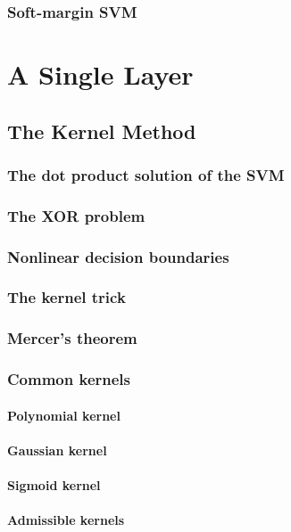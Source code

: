 \documentclass[11pt]{book} %
\begin{document}
%
%

\subsection{Soft-margin SVM}

%
%
%
%
%
%
%
%
%
%
%
%
%
%
%
%


\chapter{A Single Layer}

\section{The Kernel Method}
\subsection{The dot product solution of the SVM}
\subsection{The XOR problem}
\subsection{Nonlinear decision boundaries}
\subsection{The kernel trick}
\subsection{Mercer's theorem}
\subsection{Common kernels}
\subsubsection{Polynomial kernel}
\subsubsection{Gaussian kernel}
\subsubsection{Sigmoid kernel}
\subsubsection{Admissible kernels}
\end{document}
